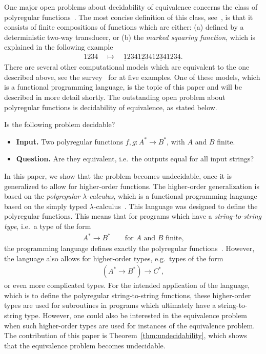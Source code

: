 \documentclass{article}
\begin{document}
One major open problems about decidability of equivalence concerns the class of polyregular functions~\cite{polyregular-survey}. 
 The most concise definition of this class, see~\cite[Section 3]{polyregular-survey},  is that it consists of finite compositions of functions which are either: (a) defined by a deterministic two-way transducer, or (b) the \emph{marked squaring function}, which is explained in the following example 
    \begin{align*}
        \label{eq:marked-squaring}
    1234 \quad \mapsto \quad \underline 1234 1\underline 234 12 \underline 34 123 \underline 4 .
    \end{align*}
There are several other computational models which are equivalent to the one described above, see the survey~\cite{polyregular-survey} for at  five examples. One of these models, which is a functional programming language, is the topic of this paper and will be described in more detail shortly. The outstanding open problem about polyregular functions is decidability of equivalence, as stated below.

 \begin{problem}\label{prob:polyregular-equivalence}
    Is the following problem decidable?
  \begin{itemize}
    \item \textbf{Input.} Two polyregular functions  $f,g : A^* \to B^*$, with $A$ and $B$ finite.
    \item \textbf{Question.} Are they equivalent, i.e.~the outputs equal for all input strings?
 \end{itemize}
 \end{problem}



 In this paper, we show that the problem becomes undecidable, once it is generalized to allow for higher-order functions. 
The higher-order generalization  is based on  the  \emph{polyregular $\lambda$-calculus}, which is a functional programming language  based on the simply typed $\lambda$-calculus~\cite[Section 4.1]{polyregular-survey}. This language was designed to define the polyregular functions. This means that for  programs which have a  \emph{string-to-string type}, i.e.~a type of the form 
\begin{align*}
A^* \to B^* \qquad \text{for $A$ and $B$ finite,}
\end{align*}
the programming language defines exactly the polyregular functions~\cite[Theorem 4.1]{polyregular-survey}. However, the  language also allows for higher-order types, e.g.~types of the form
\begin{align*}
(A^* \to B^*) \to C^*,
\end{align*}
or even more complicated types. For the intended application of the language, which is to define the polyregular string-to-string functions, these higher-order types are used for subroutines in programs which ultimately have a string-to-string type. However, one could also be interested in  the equivalence problem when such higher-order types are used for instances of the equivalence problem. The contribution of this paper is Theorem~\ref{thm:undecidability}, which shows that the equivalence problem becomes undecidable.
\end{document}
